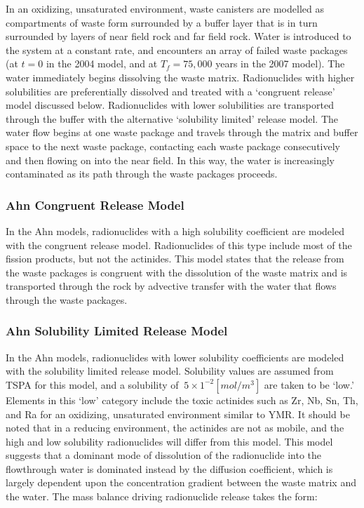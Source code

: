 In an oxidizing, unsaturated environment, waste canisters are modelled as 
compartments of waste form surrounded by a
buffer layer that is in turn surrounded by layers of near field rock and far
field rock. Water is introduced to the system at a constant rate, and
encounters an array of failed waste packages (at $t=0$ in the 2004 model, and
at $T_f=75,000$ years in the 2007 model). The water immediately begins
dissolving the waste matrix.  Radionuclides with higher solubilities are
preferentially dissolved and treated with a `congruent release' model discussed
below. Radionuclides with lower solubilities are transported through the buffer with
the alternative `solubility limited' release model. The water flow begins at
one waste package and travels through the matrix and buffer space to the next
waste package, contacting each waste package consecutively and then flowing on
into the near field. In this way, the water is increasingly contaminated as its
path through the waste packages proceeds.  

\subsubsection{Ahn Congruent Release Model} 

In the Ahn models, radionuclides with a high solubility coefficient are modeled with
the congruent release model.  Radionuclides of this type include most of the fission
products, but not the actinides. This model states that the release from the
waste packages is congruent with the dissolution of the waste matrix and is
transported through the rock by advective transfer with the water that flows
through the waste packages.  

\subsubsection{Ahn Solubility Limited Release Model}

In the Ahn models, radionuclides with lower solubility coefficients are modeled with
the solubility limited release model.  Solubility values are assumed from TSPA
for this model, and a solubility of $~5\times 1^{-2} [mol/m^3]$ are taken to be
`low.' Elements in this `low' category include the toxic actinides such as Zr,
Nb, Sn, Th, and Ra for an oxidizing, unsaturated environment similar to \gls{YMR}.
It should be noted that in a reducing environment, the actinides are not as mobile, 
and the high and low solubility radionuclides will differ from this model.
This model suggests that a dominant mode of dissolution of
the radionuclide into the flowthrough water is dominated instead by the diffusion
coefficient, which is largely dependent upon the concentration gradient between
the waste matrix and the water. The mass balance driving radionuclide release takes
the form:

